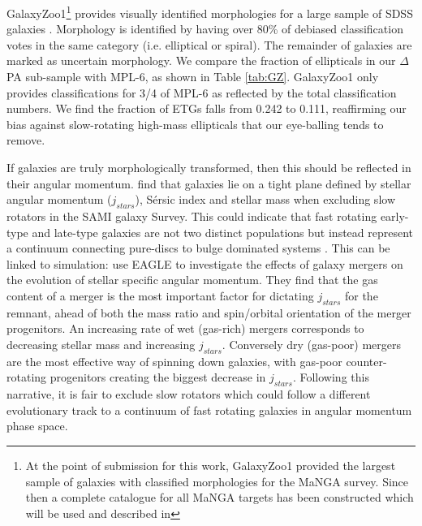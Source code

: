 GalaxyZoo1\footnote{At the point of submission for this work, GalaxyZoo1 provided the largest sample of galaxies with classified morphologies for the MaNGA survey. Since then a complete catalogue for all MaNGA targets has been constructed which will be used and described in } provides visually identified morphologies for a large sample of SDSS galaxies \citep{lintott2008}. Morphology is identified by having over 80\% of debiased classification votes in the same category (i.e. elliptical or spiral). The remainder of galaxies are marked as uncertain morphology. We compare the fraction of ellipticals in our $\Delta$PA sub-sample with MPL-6, as shown in Table \ref{tab:GZ}. GalaxyZoo1 only provides classifications for 3/4 of MPL-6 as reflected by the total classification numbers. We find the fraction of ETGs falls from 0.242 to 0.111, reaffirming our bias against slow-rotating high-mass ellipticals that our eye-balling tends to remove. 

If galaxies are truly morphologically transformed, then this should be reflected in their angular momentum. \citet{cortese2016} find that galaxies lie on a tight plane defined by stellar angular momentum ($j_{stars}$), S\'ersic index and stellar mass when excluding slow rotators in the SAMI galaxy Survey. This could indicate that fast rotating early-type and late-type galaxies are not two distinct populations but instead represent a continuum connecting pure-discs to bulge dominated systems \citep{cappellari2011}. This can be linked to simulation: \citet{lagos2017} use EAGLE \citep{EAGLE2015} to investigate the effects of galaxy mergers on the evolution of stellar specific angular momentum. They find that the gas content of a merger is the most important factor for dictating $j_{stars}$ for the remnant, ahead of both the mass ratio and spin/orbital orientation of the merger progenitors. An increasing rate of wet (gas-rich) mergers corresponds to decreasing stellar mass and increasing $j_{stars}$. Conversely dry (gas-poor) mergers are the most effective way of spinning down galaxies, with gas-poor counter-rotating progenitors creating the biggest decrease in $j_{stars}$. Following this narrative, it is fair to exclude slow rotators which could follow a different evolutionary track to a continuum of fast rotating galaxies in angular momentum phase space. 


